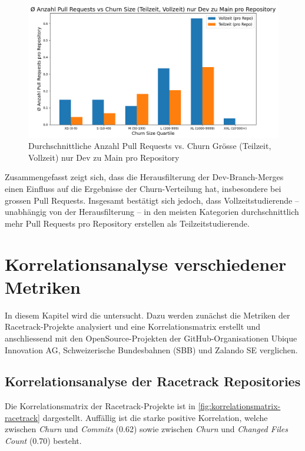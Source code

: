 \begin{figure}[htbp]
    \includegraphics[width=\textwidth]{Figures/avg-anz-prs-vs-churn-size-tz-vz-pro-repo-nur-dev.png}
    \caption{Durchschnittliche Anzahl Pull Requests vs. Churn Grösse (Teilzeit, Vollzeit) nur Dev zu Main pro Repository}
    \label{fig:anz-prs-vs-churn-size-tz-vz-nur-dev}
\end{figure}

Zusammengefasst zeigt sich, dass die Herausfilterung der Dev-Branch-Merges einen Einfluss auf die Ergebnisse der Churn-Verteilung hat, insbesondere bei grossen Pull Requests. Insgesamt bestätigt sich jedoch, dass Vollzeitstudierende – unabhängig von der Herausfilterung – in den meisten Kategorien durchschnittlich mehr Pull Requests pro Repository erstellen als Teilzeitstudierende.
\section{Korrelationsanalyse verschiedener Metriken}
\label{sec:Korrelationsanalyse}
In diesem Kapitel wird die  untersucht. Dazu werden zunächst die Metriken der Racetrack-Projekte analysiert und eine Korrelationsmatrix erstellt und anschliessend mit den OpenSource-Projekten der GitHub-Organisationen Ubique Innovation AG, Schweizerische Bundesbahnen (SBB) und Zalando SE verglichen.
\subsection{Korrelationsanalyse der Racetrack Repositories}
Die Korrelationsmatrix der Racetrack-Projekte ist in \autoref{fig:korrelationsmatrix-racetrack} dargestellt. Auffällig ist die starke positive Korrelation, welche zwischen \textit{Churn} und \textit{Commits} (0.62) sowie zwischen \textit{Churn} und \textit{Changed Files Count} (0.70) besteht. 

